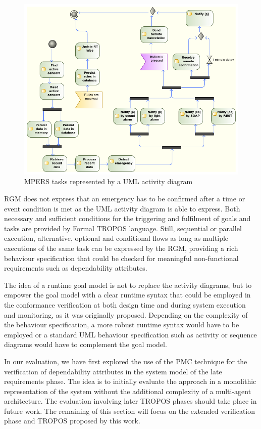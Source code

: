 \begin{figure}[h!]
\centering
\includegraphics[width=1\textwidth]{imgs/MPERS_UMLAD.png}
\caption{MPERS tasks represented by a UML activity diagram}
\label{fig:MPERS_UMLAD}
\end{figure}

RGM does not express that an emergency has to be confirmed after a time or event condition is met as the UML activity diagram is able to express. Both necessary and sufficient conditions for the triggering and fulfilment of goals and tasks are provided by Formal TROPOS language.  Still, sequential or parallel execution, alternative, optional and conditional flows as long as multiple executions of the same task can be expressed by the RGM, providing a rich behaviour specification that could be checked for meaningful non-functional requirements such as dependability attributes.

The idea of a runtime goal model is not to replace the activity diagrams, but to empower the goal model with a clear runtime syntax that could be employed in the conformance verification at both design time and during system execution and monitoring, as it was originally proposed. Depending on the complexity of the behaviour specification, a more robust runtime syntax would have to be employed or a standard UML behaviour specification such as activity or sequence diagrams would have to complement the goal model.

In our evaluation, we have first explored the use of the PMC technique for the verification of dependability attributes in the system model of the late requirements phase. The idea is to initially evaluate the approach in a monolithic representation of the system without the additional complexity of a multi-agent architecture. The evaluation involving later TROPOS phases should take place in future work. The remaining of this section will focus on the extended verification phase and TROPOS proposed by this work.


